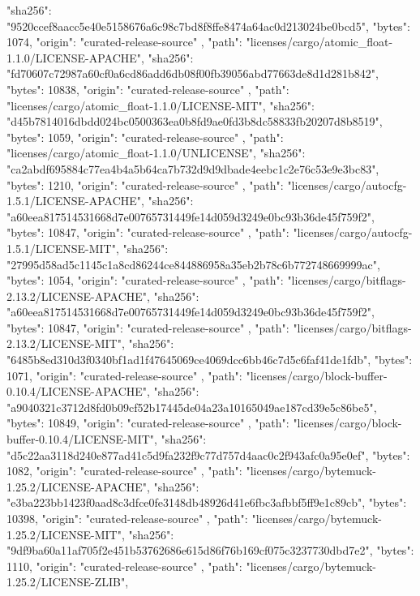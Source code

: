 {{      "sha256": "9520ccef8aacc5e40e5158676a6c98c7bd8f8ffe8474a64ac0d213024be0bcd5",
      "bytes": 1074,
      "origin": "curated-release-source"
    },
    {
      "path": "licenses/cargo/atomic_float-1.1.0/LICENSE-APACHE",
      "sha256": "fd70607c72987a60cf0a6cd86add6db08f00fb39056abd77663de8d1d281b842",
      "bytes": 10838,
      "origin": "curated-release-source"
    },
    {
      "path": "licenses/cargo/atomic_float-1.1.0/LICENSE-MIT",
      "sha256": "d45b7814016dbdd024bc0500363ea0b8fd9ae0fd3b8dc58833fb20207d8b8519",
      "bytes": 1059,
      "origin": "curated-release-source"
    },
    {
      "path": "licenses/cargo/atomic_float-1.1.0/UNLICENSE",
      "sha256": "ca2abdf695884c77ea4b4a5b64ca7b732d9d9dbade4eebc1c2e76c53e9e3bc83",
      "bytes": 1210,
      "origin": "curated-release-source"
    },
    {
      "path": "licenses/cargo/autocfg-1.5.1/LICENSE-APACHE",
      "sha256": "a60eea817514531668d7e00765731449fe14d059d3249e0bc93b36de45f759f2",
      "bytes": 10847,
      "origin": "curated-release-source"
    },
    {
      "path": "licenses/cargo/autocfg-1.5.1/LICENSE-MIT",
      "sha256": "27995d58ad5c1145c1a8cd86244ce844886958a35eb2b78c6b772748669999ac",
      "bytes": 1054,
      "origin": "curated-release-source"
    },
    {
      "path": "licenses/cargo/bitflags-2.13.2/LICENSE-APACHE",
      "sha256": "a60eea817514531668d7e00765731449fe14d059d3249e0bc93b36de45f759f2",
      "bytes": 10847,
      "origin": "curated-release-source"
    },
    {
      "path": "licenses/cargo/bitflags-2.13.2/LICENSE-MIT",
      "sha256": "6485b8ed310d3f0340bf1ad1f47645069ce4069dcc6bb46c7d5c6faf41de1fdb",
      "bytes": 1071,
      "origin": "curated-release-source"
    },
    {
      "path": "licenses/cargo/block-buffer-0.10.4/LICENSE-APACHE",
      "sha256": "a9040321c3712d8fd0b09cf52b17445de04a23a10165049ae187cd39e5c86be5",
      "bytes": 10849,
      "origin": "curated-release-source"
    },
    {
      "path": "licenses/cargo/block-buffer-0.10.4/LICENSE-MIT",
      "sha256": "d5c22aa3118d240e877ad41c5d9fa232f9c77d757d4aac0c2f943afc0a95e0ef",
      "bytes": 1082,
      "origin": "curated-release-source"
    },
    {
      "path": "licenses/cargo/bytemuck-1.25.2/LICENSE-APACHE",
      "sha256": "e3ba223bb1423f0aad8c3dfce0fe3148db48926d41e6fbc3afbbf5ff9e1c89cb",
      "bytes": 10398,
      "origin": "curated-release-source"
    },
    {
      "path": "licenses/cargo/bytemuck-1.25.2/LICENSE-MIT",
      "sha256": "9df9ba60a11af705f2e451b53762686e615d86f76b169cf075c3237730dbd7e2",
      "bytes": 1110,
      "origin": "curated-release-source"
    },
    {
      "path": "licenses/cargo/bytemuck-1.25.2/LICENSE-ZLIB",
}}
